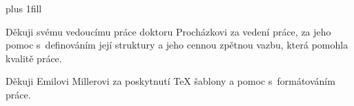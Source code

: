 \vglue 0pt plus 1fill

Děkuji svému vedoucímu práce doktoru Procházkovi za vedení práce, za jeho pomoc s~definováním její struktury a jeho cennou zpětnou vazbu, která pomohla kvalitě práce.

Děkuji Emilovi Millerovi za poskytnutí TeX šablony a pomoc s~formátováním práce.



\vspace{20mm}
\newpage


